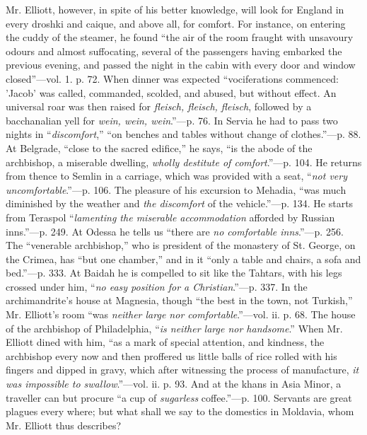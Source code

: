 Mr.
Elliott, however, in spite of his better knowledge, will look for
England in every droshki and caique, and above all, for comfort. For
instance, on entering the cuddy of the steamer, he found ``the air of the
room fraught with unsavoury odours and almost suffocating, several of
the passengers having embarked the previous evening, and passed the
night in the cabin with every door and window closed''—vol. 1. p. 72.
When dinner was expected ``vociferations commenced: 'Jacob' was called,
commanded, scolded, and abused, but without effect. An universal roar
was then raised for \emph{fleisch, fleisch, fleisch}, followed by a
bacchanalian yell for \emph{wein, wein, wein}.''—p. 76. In Servia he
had to pass two nights in ``\emph{discomfort},'' ``on benches and tables
without change of clothes.''—p. 88. At Belgrade, ``close to the sacred
edifice,'' he says, ``is the abode of the archbishop, a miserable
dwelling, \emph{wholly destitute of comfort}.''—p. 104. He returns from
thence to Semlin in a carriage, which was provided with a seat, ``\emph{not
very uncomfortable}.''—p. 106. The pleasure of his excursion to
Mehadia, ``was much diminished by the weather and \emph{the discomfort}
of the vehicle.''—p. 134. He starts from Teraspol ``\emph{lamenting the
miserable accommodation} afforded by Russian inns.''—p. 249. At
Odessa he tells us ``there are \emph{no comfortable inns}.''—p. 256. The
``venerable archbishop,'' who is president of the monastery of St. George,
on the Crimea, has ``but one chamber,'' and in it ``only a table and
chairs, a sofa and bed.''—p. 333. At Baidah he is compelled to sit like
the Tahtars, with his legs crossed under him, ``\emph{no easy position for a
Christian}.''—p. 337. In the archimandrite's house at Magnesia,
though ``the best in the town, not Turkish,'' Mr. Elliott's room ``was \emph{neither
large nor comfortable}.''—vol. ii. p. 68. The house of the
archbishop of Philadelphia, ``\emph{is neither large nor handsome}.'' When
Mr. Elliott dined with him, ``as a mark of special attention, and
kindness, the archbishop every now and then proffered us little balls of rice rolled with his fingers and dipped in gravy, which after
witnessing the process of manufacture, \emph{it was impossible to swallow}.''—vol.
ii. p. 93. And at the khans in Asia Minor, a traveller can but procure ``a
cup of \emph{sugarless} coffee.''—p. 100. Servants are great plagues
every where; but what shall we say to the domestics in Moldavia, whom
Mr. Elliott thus describes?

